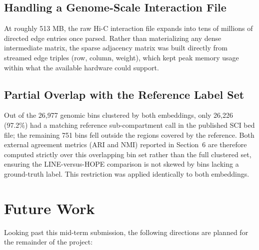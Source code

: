 \documentclass[12pt]{article}
\begin{document}
\subsection{Handling a Genome-Scale Interaction File}
At roughly 513 MB, the raw Hi-C interaction file expands into tens of millions of directed edge
entries once parsed. Rather than materializing any dense intermediate matrix, the sparse
adjacency matrix was built directly from streamed edge triples (row, column, weight), which kept
peak memory usage within what the available hardware could support.

\subsection{Partial Overlap with the Reference Label Set}
Out of the 26,977 genomic bins clustered by both embeddings, only 26,226 (97.2\%) had a matching
reference sub-compartment call in the published SCI bed file; the remaining 751 bins fell outside
the regions covered by the reference. Both external agreement metrics (ARI and NMI) reported in
Section~6 are therefore computed strictly over this overlapping bin set rather than the full
clustered set, ensuring the LINE-versus-HOPE comparison is not skewed by bins lacking a
ground-truth label. This restriction was applied identically to both embeddings.

\section{Future Work}

Looking past this mid-term submission, the following directions are planned for the remainder of
the project:
\end{document}
